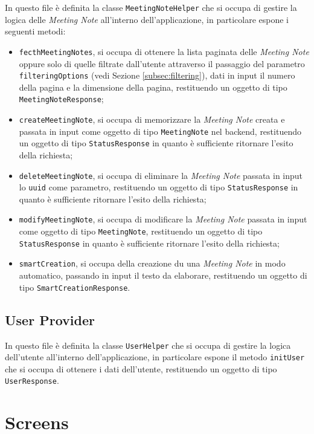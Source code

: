 In questo file è definita la classe \lstinline{MeetingNoteHelper} che si occupa di gestire la logica delle \emph{Meeting Note} all'interno dell'applicazione, in particolare espone i seguenti metodi:
\begin{itemize}
    \item \lstinline{fecthMeetingNotes}, si occupa di ottenere la lista paginata delle \emph{Meeting Note} oppure solo di quelle filtrate dall'utente attraverso il passaggio del parametro \lstinline{filteringOptions} (vedi Sezione \ref{subsec:filtering}), dati in input il numero della pagina e la dimensione della pagina, restituendo un oggetto di tipo \lstinline{MeetingNoteResponse};
    \item \lstinline{createMeetingNote}, si occupa di memorizzare la \emph{Meeting Note} creata e passata in input come oggetto di tipo \lstinline{MeetingNote} nel \gls{backend}\glsoccur, restituendo un oggetto di tipo \lstinline{StatusResponse} in quanto è sufficiente ritornare l'esito della richiesta;
    \item \lstinline{deleteMeetingNote}, si occupa di eliminare la \emph{Meeting Note} passata in input lo \lstinline{uuid} come parametro, restituendo un oggetto di tipo \lstinline{StatusResponse} in quanto è sufficiente ritornare l'esito della richiesta;
    \item \lstinline{modifyMeetingNote}, si occupa di modificare la \emph{Meeting Note} passata in input come oggetto di tipo \lstinline{MeetingNote}, restituendo un oggetto di tipo \lstinline{StatusResponse} in quanto è sufficiente ritornare l'esito della richiesta;
    \item \lstinline{smartCreation}, si occupa della creazione du una \emph{Meeting Note} in modo automatico, passando in input il testo da elaborare, restituendo un oggetto di tipo \lstinline{SmartCreationResponse}.
\end{itemize}

\subsection{User Provider}
\label{subsec:user-provider}

In questo file è definita la classe \lstinline{UserHelper} che si occupa di gestire la logica dell'utente all'interno dell'applicazione, in particolare espone il metodo \lstinline{initUser} che si occupa di ottenere i dati dell'utente, restituendo un oggetto di tipo \lstinline{UserResponse}.

\section{Screens}
\label{sec:screens}

